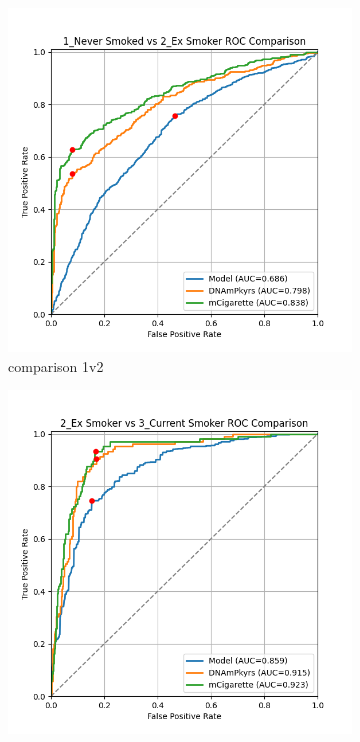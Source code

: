\documentclass{article}
\begin{document}
\begin{figure}
    \centering
    \begin{subfigure}{0.48\textwidth}
        \centering
        \includegraphics[width=\linewidth]{comparison_1v2_roc.png}
        \caption{comparison 1v2}
    \end{subfigure}
    \hfill
    \begin{subfigure}{0.48\textwidth}
        \centering
        \includegraphics[width=\linewidth]{comparison_2v3_roc.png}

\end{subfigure}
\end{figure}
\end{document}
